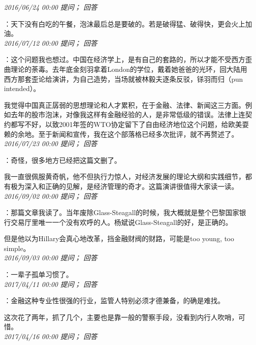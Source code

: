 \documentclass[twocolumn]{ctexart}
\begin{document}
\textit{\hfill\noindent\small 2016/06/24 00:00 提问； 回答}

：天下没有白吃的午餐，泡沫最后总是要破的。若是破得猛、破得快，更会火上加油。\\

\textit{\hfill\noindent\small 2016/07/12 00:00 提问； 回答}

：这个问题我也想过。中国在经济学上，是有自己的套路的，所以才能不受西方歪曲理论的荼毒。去年底金刻羽拿着London的学位，戴着她爸爸的光环，回大陆用西方那套歪论给演讲，为自己造势，当场就被林毅夫逐条反驳，铩羽而归（pun intended）。

我觉得中国真正孱弱的思想理论和人才累积，在于金融、法律、新闻这三方面。例如去年的股市泡沫，对像我这样有金融经验的人，是非常低级的错误。法律上连契约都写不好，以致2001年签的WTO协定留下了自由经济地位这个问题，给欧美耍赖的余地。至于新闻和宣传，我在这个部落格已经多次批评，就不再赘述了。\\

\textit{\hfill\noindent\small 2016/07/23 00:00 提问； 回答}

：奇怪，很多地方已经把这篇文删了。

我一直很佩服黄奇帆，他不但执行力惊人，对经济发展的理论大纲和实践细节，都有极为深入和正确的见解，是经济管理的奇才。这篇演讲很值得大家读一读。\\

\textit{\hfill\noindent\small 2016/09/02 00:00 提问； 回答}

：那篇文章我读了。当年废除Glass-Steagall的时候，我大概就是整个巴黎国家银行交易厅里唯一一个没有欢呼的人。杨斌说Glass-Steagall的好，是正确的。

但是他以为Hillary会真心地改革，挡金融财阀的财路，可能是too young, too simple。\\

\textit{\hfill\noindent\small 2016/09/03 00:00 提问； 回答}

：一辈子孤单习惯了。\\

\textit{\hfill\noindent\small 2017/04/11 00:00 提问； 回答}

：金融这种专业性很强的行业，监管人特别必须才德兼备，的确是难找。

这次花了两年，抓了几个，主要也是靠一般的警察手段，没看到内行人吹哨，可惜。\\

\textit{\hfill\noindent\small 2017/04/16 00:00 提问； 回答}
\end{document}
